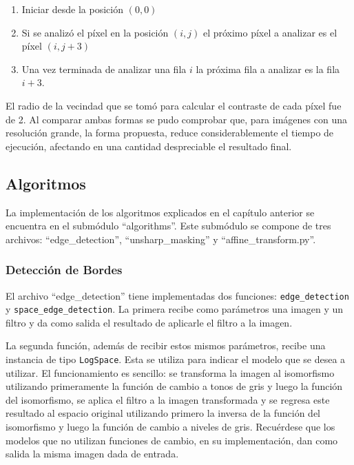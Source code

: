 \begin{enumerate}
	\item Iniciar desde la posici\'on $(0,0)$
	\item Si se analiz\'o el p\'ixel en la posici\'on $(i,j)$ el pr\'oximo p\'ixel a analizar es el p\'ixel $(i,j+3)$
	\item Una vez terminada de analizar una fila $i$ la pr\'oxima fila a analizar es la fila $i+3$.
\end{enumerate}

El radio de la vecindad que se tom\'o para calcular el contraste de cada p\'ixel fue de 2. Al comparar ambas formas se pudo comprobar que, para im\'agenes con una resoluci\'on grande, la forma propuesta, reduce considerablemente el tiempo de ejecuci\'on, afectando en una cantidad despreciable el resultado final.

\subsection{Algoritmos}

La implementaci\'on de los algoritmos explicados en el cap\'itulo anterior se encuentra en el subm\'odulo ``algorithms''. Este subm\'odulo se compone de tres archivos: ``edge\_detection'', ``unsharp\_masking'' y ``affine\_transform.py''.

\subsubsection{Detecci\'on de Bordes}

El archivo ``edge\_detection'' tiene implementadas dos funciones: \verb|edge_detection| y \verb|space_edge_detection|. La primera recibe como par\'ametros una imagen y un filtro y da como salida el resultado de aplicarle el filtro a la imagen. 

La segunda funci\'on, adem\'as de recibir estos mismos par\'ametros, recibe una instancia de tipo \verb|LogSpace|. Esta se utiliza para indicar el modelo que se desea a utilizar. El funcionamiento es sencillo: se transforma la imagen al isomorfismo utilizando primeramente la funci\'on de cambio a tonos de gris y luego la funci\'on del isomorfismo, se aplica el filtro a la imagen transformada y se regresa este resultado al espacio original utilizando primero la inversa de la funci\'on del isomorfismo y luego la funci\'on de cambio a niveles de gris. Recu\'erdese que los modelos que no utilizan funciones de cambio, en su implementaci\'on, dan como salida la misma imagen dada de entrada.

